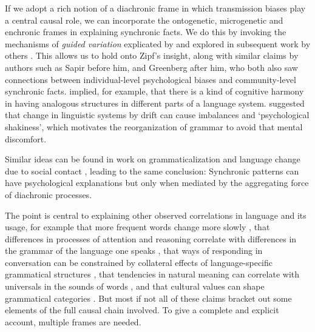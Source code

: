 If we adopt a rich notion of a diachronic frame in which transmission 
biases play a central causal role, we can incorporate the ontogenetic, 
microgenetic and enchronic frames in explaining synchronic facts. We do this by invoking the mechanisms of \textit{guided variation} explicated by 
\citet{boyd_culture_1985,boyd_origin_2005} and explored in subsequent work by 
others \citep{kirby_function_1999,kirby_ug_2004,christiansen_language_2008,chater_language_2010}. This allows us to hold 
onto Zipf's insight, along with similar claims by authors such as 
Sapir before him, and Greenberg after him, who both also saw connections 
between individual-level psychological biases and community-level synchronic facts. \citet{greenberg_universals_1966} implied, for example, that there is a kind of cognitive 
harmony in having analogous structures in different parts of a language 
system. \citet[154-8]{sapir_language:_1921} suggested that change in linguistic 
systems by drift can cause imbalances and \textquoteleft psychological 
shakiness', which motivates the reorganization of grammar to avoid 
that mental discomfort. 



Similar ideas can be found in work on grammaticalization \citep{givon_syntax:_1984,bybee_language_2010} and language change due to social contact \citep{weinreich_languages_1953}, leading to the same conclusion: Synchronic patterns can have 
psychological explanations but only when mediated by the aggregating 
force of diachronic processes. 



The point is central to explaining other observed 
correlations in language and its usage, for example that more frequent words change more slowly 
\citep{pagel_frequency_2007}, that differences in processes of 
attention and reasoning correlate with differences in the grammar of the 
language one speaks \citep{whorf_language_1956,lucy_language_1992,slobin_thought_1996}, 
that ways of responding in conversation can be constrained by collateral 
effects of language-specific grammatical structures \citep{sidnell_language_2012}, that tendencies in natural meaning can correlate with universals in the sounds of words \citep{dingemanse_is_2013}, and that cultural values can shape grammatical categories \citep{hale_notes_1986,wierzbicka_semantics_1992,chafe_loci_2000,enfield_ethnosyntax:_2002,everett_cultural_2005,everett_language:_2012}. But most if not all of these claims bracket out some elements of the full 
causal chain involved. To give a complete and explicit account, multiple frames are needed.





 \newpage